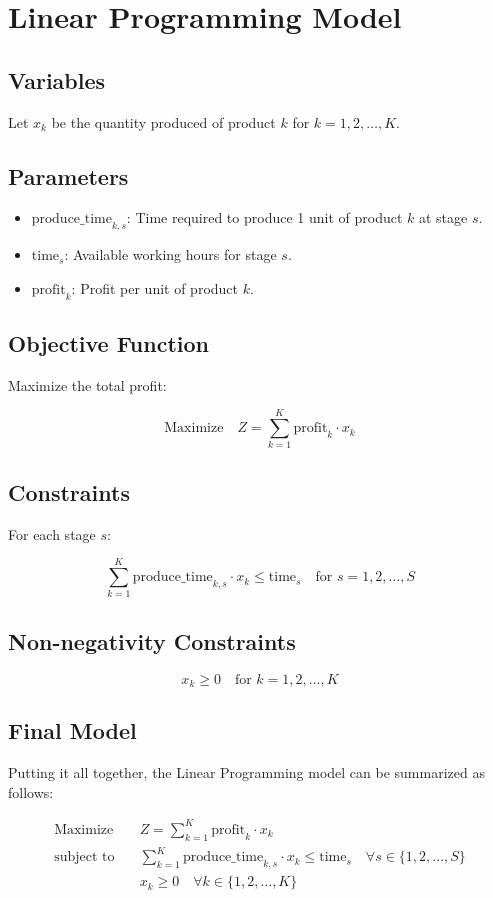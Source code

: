 \documentclass{article}
\begin{document}
\section*{Linear Programming Model}

\subsection*{Variables}
Let \( x_k \) be the quantity produced of product \( k \) for \( k = 1, 2, \ldots, K \).

\subsection*{Parameters}
\begin{itemize}
    \item \( \text{produce\_time}_{k,s} \): Time required to produce 1 unit of product \( k \) at stage \( s \).
    \item \( \text{time}_s \): Available working hours for stage \( s \).
    \item \( \text{profit}_k \): Profit per unit of product \( k \).
\end{itemize}

\subsection*{Objective Function}
Maximize the total profit:

\[
\text{Maximize} \quad Z = \sum_{k=1}^{K} \text{profit}_k \cdot x_k
\]

\subsection*{Constraints}
For each stage \( s \):

\[
\sum_{k=1}^{K} \text{produce\_time}_{k,s} \cdot x_k \leq \text{time}_s \quad \text{for } s = 1, 2, \ldots, S
\]

\subsection*{Non-negativity Constraints}
\[
x_k \geq 0 \quad \text{for } k = 1, 2, \ldots, K
\]

\subsection*{Final Model}
Putting it all together, the Linear Programming model can be summarized as follows:

\[
\begin{align*}
\text{Maximize} \quad & Z = \sum_{k=1}^{K} \text{profit}_k \cdot x_k \\
\text{subject to} \quad & \sum_{k=1}^{K} \text{produce\_time}_{k,s} \cdot x_k \leq \text{time}_s \quad \forall s \in \{1, 2, \ldots, S\} \\
& x_k \geq 0 \quad \forall k \in \{1, 2, \ldots, K\}
\end{align*}
\]
\end{document}
